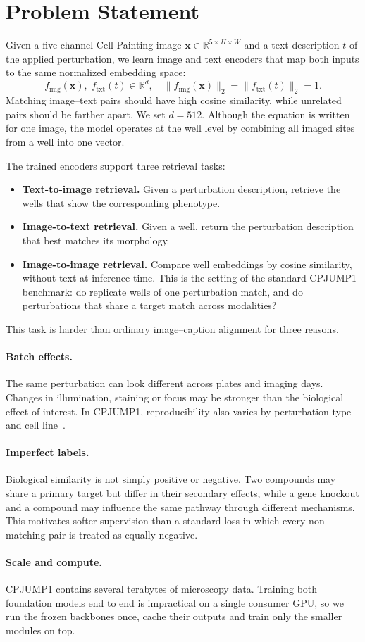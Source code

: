 \section{Problem Statement}

Given a five-channel Cell Painting image $\mathbf{x} \in \mathbb{R}^{5 \times H \times W}$ and a
text description $t$ of the applied perturbation, we learn image and text encoders that map both
inputs to the same normalized embedding space:
\begin{equation}
  f_{\text{img}}(\mathbf{x}),\;
  f_{\text{txt}}(t) \in \mathbb{R}^d,
  \quad
  \|f_{\text{img}}(\mathbf{x})\|_2
  = \|f_{\text{txt}}(t)\|_2
  = 1.
\end{equation}
Matching image--text pairs should have high cosine similarity, while unrelated pairs should be
farther apart. We set $d=512$. Although the equation is written for one image, the model operates
at the well level by combining all imaged sites from a well into one vector.

The trained encoders support three retrieval tasks:
\begin{itemize}
  \item \textbf{Text-to-image retrieval.}
        Given a perturbation description, retrieve the wells that show the corresponding phenotype.
  \item \textbf{Image-to-text retrieval.}
        Given a well, return the perturbation description that best matches its morphology.
  \item \textbf{Image-to-image retrieval.}
        Compare well embeddings by cosine similarity, without text at inference time. This is the
        setting of the standard CPJUMP1 benchmark: do replicate wells of one perturbation match, and
        do perturbations that share a target match across modalities?
\end{itemize}

This task is harder than ordinary image--caption alignment for three reasons.

\paragraph{Batch effects.}
The same perturbation can look different across plates and imaging days. Changes in illumination,
staining or focus may be stronger than the biological effect of interest. In CPJUMP1,
reproducibility also varies by perturbation type and cell line~\cite{chandrasekaran2024jump}.

\paragraph{Imperfect labels.}
Biological similarity is not simply positive or negative. Two compounds may share a primary target
but differ in their secondary effects, while a gene knockout and a compound may influence the same
pathway through different mechanisms. This motivates softer supervision than a standard loss in
which every non-matching pair is treated as equally negative.

\paragraph{Scale and compute.}
CPJUMP1 contains several terabytes of microscopy data. Training both foundation models end to end
is impractical on a single consumer GPU, so we run the frozen backbones once, cache their outputs
and train only the smaller modules on top.
